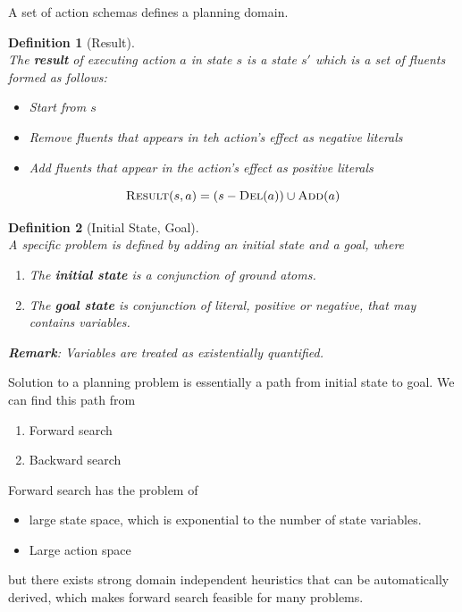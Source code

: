 \documentclass[12pt]{article}
\newtheorem{definition}{Definition}[section]
\theoremstyle{definition}
\begin{document}
A set of action schemas defines a planning domain.
\begin{definition}[Result]
\hfill\\\normalfont The \textbf{result} of executing action $a$ in state $s$ is a state $s'$ which is a set of fluents formed as follows:
\begin{itemize}
	\item Start from $s$
	\item Remove fluents that appears in teh action's effect as negative literals
	\item Add fluents that appear in the action's effect as positive literals
\end{itemize}
\[
\textsc{Result}(s,a) = (s-\textsc{Del}(a))\cup\textsc{Add}(a)
\]
\end{definition}
\begin{definition}[Initial State, Goal]
\hfill\\\normalfont A specific problem is defined by adding an initial state and a goal, where
\begin{enumerate}
	\item The \textbf{initial state} is a conjunction of ground atoms.
	\item The \textbf{goal state} is conjunction of literal, positive or negative, that may contains variables.
\end{enumerate}
\textbf{Remark}: Variables are treated as existentially quantified.
\end{definition}
Solution to a planning problem is essentially a path from initial state to goal. We can find this path from 
\begin{enumerate}
	\item Forward search
	\item Backward search
\end{enumerate}
Forward search has the problem of 
\begin{itemize}
\item large state space, which is exponential to the number of state variables.
\item Large action space
\end{itemize}
but there exists strong domain independent heuristics that can be automatically derived, which makes forward search feasible for many problems.\\
\end{document}
